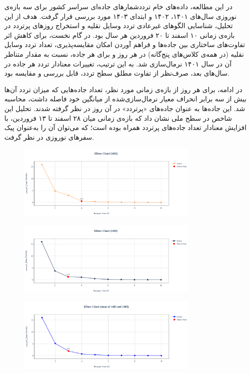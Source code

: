 \documentclass[a4paper, 12pt]{article}
\begin{document}
در این مطالعه، داده‌های خام ترددشمارهای جاده‌ای سراسر کشور برای سه بازه‌ی نوروزی سال‌های ۱۴۰۱، ۱۴۰۲ و ابتدای ۱۴۰۳ مورد بررسی قرار گرفت. هدف از این تحلیل، شناسایی الگوهای غیرعادی تردد وسایل نقلیه و استخراج روزهای پرتردد در بازه‌ی زمانی ۱۰ اسفند تا ۲۰ فروردین هر سال بود. در گام نخست، برای کاهش اثر تفاوت‌های ساختاری بین جاده‌ها و فراهم آوردن امکان مقایسه‌پذیری، تعداد تردد وسایل نقلیه (در همه‌ی کلاس‌های پنج‌گانه) در هر روز و برای هر جاده، نسبت به مقدار متناظر آن در سال ۱۴۰۱ نرمال‌سازی شد. به این ترتیب، تغییرات معنادار تردد هر جاده در سال‌های بعد، صرف‌نظر از تفاوت مطلق سطح تردد، قابل بررسی و مقایسه بود.

\medskip
در ادامه، برای هر روز از بازه‌ی زمانی مورد نظر، تعداد جاده‌هایی که میزان تردد آن‌ها بیش از سه برابر انحراف معیار نرمال‌سازی‌شده از میانگین خود فاصله داشت، محاسبه شد. این جاده‌ها به عنوان جاده‌های «پرتردد» در آن روز در نظر گرفته شدند. تحلیل این شاخص در سطح ملی نشان داد که بازه‌ی زمانی میان ۲۸ اسفند تا ۱۳ فروردین، با افزایش معنادار تعداد جاده‌های پرتردد همراه بوده است؛ که می‌توان آن را به‌عنوان پیک سفرهای نوروزی در نظر گرفت.

\begin{figure}[H]
    \centering
    \includegraphics[width=0.8\textwidth]{pics/peaks/elbow1402.png}
\end{figure}

\begin{figure}[H]
    \centering
    \includegraphics[width=0.8\textwidth]{pics/peaks/elbow1403.png}
\end{figure}

\begin{figure}[H]
    \centering
    \includegraphics[width=0.8\textwidth]{pics/peaks/elbowmean.png}
\end{figure}
\end{document}
